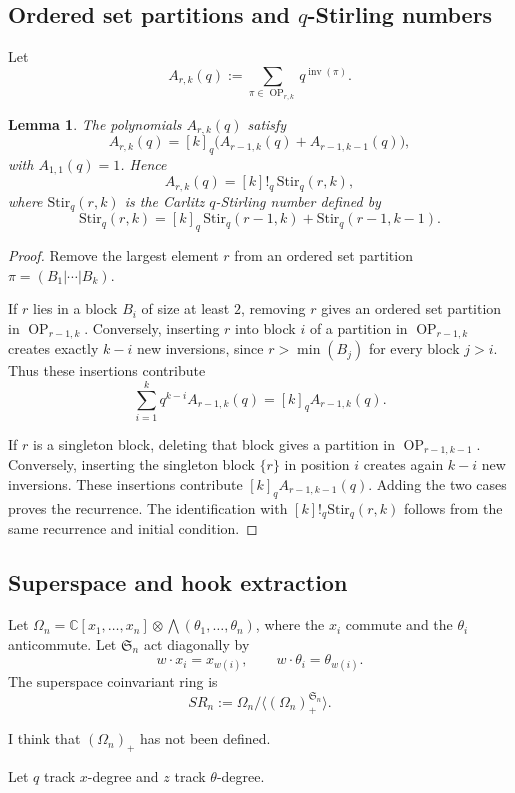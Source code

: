 \documentclass[12pt]{article}
\newtheorem{lemma}[theorem]{Lemma}
\DeclareMathOperator{\Inv}{inv}
\DeclareMathOperator{\OP}{OP}
\newcommand{\C}{\mathbb{C}}
\newcommand{\Sn}{\mathfrak{S}_n}
\newcommand{\review}[1]{\begin{reviewbox}#1\end{reviewbox}}
\begin{document}
\subsection{Ordered set partitions and \(q\)-Stirling numbers}

Let
\[
A_{r,k}(q):=\sum_{\pi\in \OP_{r,k}} q^{\Inv(\pi)}.
\]

\begin{lemma}
The polynomials \(A_{r,k}(q)\) satisfy
\[
A_{r,k}(q)=[k]_q\bigl(A_{r-1,k}(q)+A_{r-1,k-1}(q)\bigr),
\]
with \(A_{1,1}(q)=1\). Hence
\[
A_{r,k}(q)=[k]!_q\,\mathrm{Stir}_q(r,k),
\]
where \(\mathrm{Stir}_q(r,k)\) is the Carlitz \(q\)-Stirling number defined by
\[
\mathrm{Stir}_q(r,k)=[k]_q\,\mathrm{Stir}_q(r-1,k)+\mathrm{Stir}_q(r-1,k-1).
\]
\end{lemma}

\begin{proof}
Remove the largest element \(r\) from an ordered set partition
\(\pi=(B_1|\cdots|B_k)\).

If \(r\) lies in a block \(B_i\) of size at least \(2\), removing \(r\) gives an
ordered set partition in \(\OP_{r-1,k}\). Conversely, inserting \(r\) into block
\(i\) of a partition in \(\OP_{r-1,k}\) creates exactly \(k-i\) new inversions,
since \(r>\min(B_j)\) for every block \(j>i\). Thus these insertions contribute
\[
\sum_{i=1}^k q^{k-i} A_{r-1,k}(q)=[k]_q A_{r-1,k}(q).
\]

If \(r\) is a singleton block, deleting that block gives a partition in
\(\OP_{r-1,k-1}\). Conversely, inserting the singleton block \(\{r\}\) in
position \(i\) creates again \(k-i\) new inversions. These insertions contribute
\([k]_q A_{r-1,k-1}(q)\). Adding the two cases proves the recurrence. The
identification with \([k]!_q\mathrm{Stir}_q(r,k)\) follows from the same recurrence
and initial condition.
\end{proof}

\subsection{Superspace and hook extraction}

Let \(\Omega_n=\C[x_1,\dots,x_n]\otimes \bigwedge(\theta_1,\dots,\theta_n)\), where
the \(x_i\) commute and the \(\theta_i\) anticommute. Let \(\Sn\) act diagonally by
\[
w\cdot x_i=x_{w(i)},\qquad w\cdot \theta_i=\theta_{w(i)}.
\]
The superspace coinvariant ring is
\[
SR_n:=\Omega_n/\langle(\Omega_n)^{\Sn}_+\rangle.
\]
\review{I think that $(\Omega_n)_+$ has not been defined.}
Let \(q\) track \(x\)-degree and \(z\) track \(\theta\)-degree.
\end{document}
